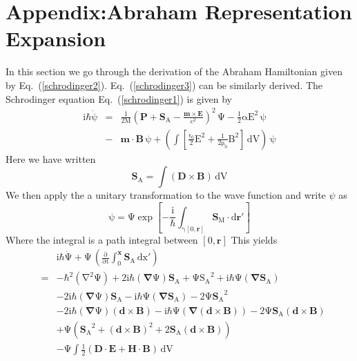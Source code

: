 \section{Appendix:Abraham Representation Expansion}
\label{App_1-1}
In this section we go through the derivation of the Abraham Hamiltonian given by Eq.\ (\ref{schrodinger2}).  Eq.\ (\ref{schrodinger3}) can be similarly derived.  The Schrodinger equation Eq.\ (\ref{schrodinger1}) is given by
\begin{eqnarray}
\mathrm{i\hbar\dot{\psi}}&=&\mathrm{\frac{1}{2M}\left(\mathbf{P}+ \mathbf{S}_A-\frac{\mathbf{m}\times\mathbf{E}}{c^2}\right)^2\,\Psi-\frac{1}{2}\alpha E^2\,\psi}\nonumber \\
&-&\mathrm{\mathbf{m}\cdot\mathbf{B}\,\psi+\left(\int\left[\frac{\epsilon_0}{2}E^2+ \frac{1}{2\mu_0}B^2\right]\,dV\right)\,\psi}
\label{schrodingerappendix1}
\end{eqnarray}
Here we have written 
\begin{equation}
\mathrm{\mathbf{S}_A=\int \left(\mathbf{D}\times\mathbf{B}\right) \, dV}
\end{equation}
We then apply the a unitary transformation to the wave function and write $\psi$ as
\begin{equation}
\mathrm{\psi=\Psi\exp{\left[-\frac{\mathrm{i}}{\mathrm{\hbar}}\int_{\gamma[0,\mathbf{r}]}\mathbf{S}_M\cdot d\mathbf{r}'\right]}}
\label{abrahamrepappendix}
\end{equation}
Where the integral is a path integral between $[0,\mathrm{\mathbf{r}}]$
This yields
\begin{eqnarray}
&&\mathrm{\mathrm{i}\mathrm{\hbar}\dot{\Psi}+\Psi\,\left(\frac{\partial}{\partial t}\mathrm{\int_0^\mathbf{x} \mathbf{S}_A \, \mathrm{dx'}}\right)}\nonumber \\
&=&\mathrm{-\hbar^2(\nabla^2\Psi)+2i\hbar(\mathbf{\nabla}\Psi)\mathbf{S}_A+\Psi {S_A}^2+i\hbar\Psi(\mathbf{\nabla}\mathbf{S}_A)} \nonumber \\
&&\mathrm{-2i\hbar(\mathbf{\nabla}\Psi)\mathbf{S}_A-i\hbar\Psi(\mathbf{\nabla}\mathbf{S}_A)-2\Psi{\mathbf{S}_A}^2} \nonumber \\
&&\mathrm{-2i\hbar(\mathbf{\nabla}\Psi)(\mathbf{d}\times\mathbf{B})-i\hbar\Psi(\mathbf{\nabla}(\mathbf{d}\times\mathbf{B}))-2\Psi\mathbf{S}_A(\mathbf{d}\times\mathbf{B}) }\nonumber \\
&&\mathrm{+\Psi\left({\mathbf{S}_A}^2+(\mathbf{d}\times\mathbf{B})^2+2\mathbf{S}_A(\mathbf{d}\times\mathbf{B})\right)}\nonumber \\
&&\mathrm{-\Psi\int\frac{1}{2}\left(\mathbf{D\cdot E +H\cdot B}\right)\,dV}
\label{schrodingera2}
\end{eqnarray}
